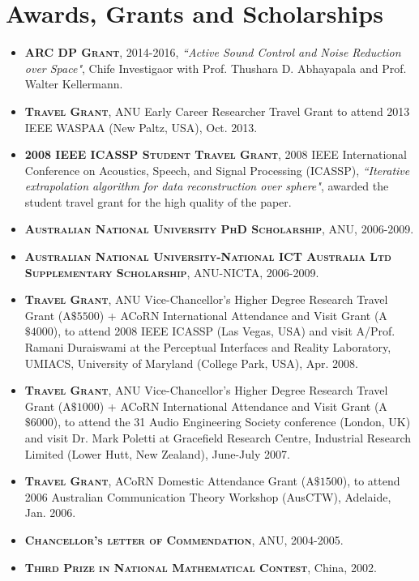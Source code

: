 \documentclass[11pt]{article}
\begin{document}
\section*{Awards, Grants and Scholarships}
%
\begin{itemize}
%

\item \textsc{\textbf{ARC DP Grant}}, 2014-2016, \emph{``Active Sound Control and Noise Reduction over Space"}, Chife Investigaor with Prof. Thushara D. Abhayapala and Prof. Walter Kellermann.

\item \textsc{\textbf{Travel Grant}}, ANU Early Career Researcher Travel Grant to attend 2013 IEEE WASPAA (New Paltz, USA), Oct. 2013.

\item \textsc{\textbf{2008 IEEE ICASSP Student Travel Grant}}, 2008 IEEE International Conference on Acoustics,
Speech, and Signal Processing (ICASSP), \emph{``Iterative extrapolation algorithm for data reconstruction over sphere"}, awarded the student
travel grant for the high quality of the paper.

\item \textsc{\textbf{Australian National University PhD Scholarship}}, ANU, 2006-2009.

\item \textsc{\textbf{Australian National University-National ICT Australia Ltd Supplementary Scholarship}},
ANU-NICTA, 2006-2009.

\item \textsc{\textbf{Travel Grant}}, ANU Vice-Chancellor's Higher Degree Research Travel Grant (A$\$5500$)
+ ACoRN International Attendance and Visit Grant (A$\$4000$), to attend 2008 IEEE ICASSP (Las Vegas, USA) and visit A/Prof. Ramani Duraiswami at
the Perceptual Interfaces and Reality Laboratory, UMIACS, University of Maryland (College Park, USA), Apr. 2008.

\item \textsc{\textbf{Travel Grant}}, ANU Vice-Chancellor's Higher Degree Research Travel Grant (A$\$1000$)
+ ACoRN International Attendance and Visit Grant (A$\$6000$), to attend the 31 Audio Engineering Society conference (London, UK) and visit Dr.
Mark Poletti at Gracefield Research Centre, Industrial Research Limited (Lower Hutt, New Zealand), June-July 2007.

\item \textsc{\textbf{Travel Grant}}, ACoRN Domestic Attendance Grant (A$\$1500$), to attend 2006 Australian Communication Theory Workshop
(AusCTW), Adelaide, Jan. 2006.

\item \textsc{\textbf{Chancellor's letter of Commendation}}, ANU, 2004-2005.

\item \textsc{\textbf{Third Prize in National Mathematical Contest}}, China, 2002.

\end{itemize}
%
\end{document}

